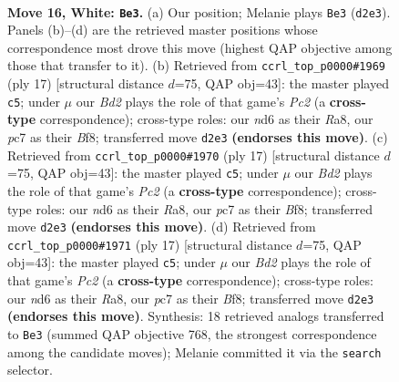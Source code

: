 \documentclass[11pt]{article}
\begin{document}
\clearpage

\begin{figure}[p]\centering
\begin{subfigure}{0.46\textwidth}\centering
\resizebox{\linewidth}{!}{%
\newchessgame
\chessboard[
  setfen={r1bq2k1/pppp1ppp/3n4/2bP4/8/2N4P/PPPB1PP1/R3QBK1 w - - 3 16},
  showmover=false,
  pgfstyle=straightmove, color=movearrow, markmove={d2-e3}
]}
\caption{}
\end{subfigure}\hfill
\begin{subfigure}{0.46\textwidth}\centering
\resizebox{\linewidth}{!}{%
\newchessgame
\chessboard[
  setfen={r2qkb1r/pbpn1ppp/1p2p3/8/3PP3/P1P2N2/2Q2PPP/R1B1KB1R b KQkq - 0 9},
  showmover=false,
  pgfstyle=straightmove, color=movearrow, markmove={c7-c5}
]}
\caption{}
\end{subfigure}
\\[4pt]
\begin{subfigure}{0.46\textwidth}\centering
\resizebox{\linewidth}{!}{%
\newchessgame
\chessboard[
  setfen={r2qkb1r/pbpn1ppp/1p2p3/8/3PP3/P1P2N2/2Q2PPP/R1B1KB1R b KQkq - 0 9},
  showmover=false,
  pgfstyle=straightmove, color=movearrow, markmove={c7-c5}
]}
\caption{}
\end{subfigure}\hfill
\begin{subfigure}{0.46\textwidth}\centering
\resizebox{\linewidth}{!}{%
\newchessgame
\chessboard[
  setfen={r2qkb1r/pbpn1ppp/1p2p3/8/3PP3/P1P2N2/2Q2PPP/R1B1KB1R b KQkq - 0 9},
  showmover=false,
  pgfstyle=straightmove, color=movearrow, markmove={c7-c5}
]}
\caption{}
\end{subfigure}
\caption{\textbf{Move 16, White: \texttt{Be3}.} (a) Our position; Melanie plays \texttt{Be3} (\texttt{d2e3}). Panels (b)--(d) are the retrieved master positions whose correspondence most drove this move (highest QAP objective among those that transfer to it). (b) Retrieved from \texttt{ccrl\_top\_p0000\#1969} (ply 17) [structural distance $d$=75, QAP obj=43]: the master played \texttt{c5}; under $\mu$ our \emph{Bd2} plays the role of that game's \emph{Pc2} (a \textbf{cross-type} correspondence); cross-type roles: our \emph{n}d6 as their \emph{R}a8, our \emph{p}c7 as their \emph{B}f8; transferred move \texttt{d2e3} \textbf{(endorses this move)}. (c) Retrieved from \texttt{ccrl\_top\_p0000\#1970} (ply 17) [structural distance $d$=75, QAP obj=43]: the master played \texttt{c5}; under $\mu$ our \emph{Bd2} plays the role of that game's \emph{Pc2} (a \textbf{cross-type} correspondence); cross-type roles: our \emph{n}d6 as their \emph{R}a8, our \emph{p}c7 as their \emph{B}f8; transferred move \texttt{d2e3} \textbf{(endorses this move)}. (d) Retrieved from \texttt{ccrl\_top\_p0000\#1971} (ply 17) [structural distance $d$=75, QAP obj=43]: the master played \texttt{c5}; under $\mu$ our \emph{Bd2} plays the role of that game's \emph{Pc2} (a \textbf{cross-type} correspondence); cross-type roles: our \emph{n}d6 as their \emph{R}a8, our \emph{p}c7 as their \emph{B}f8; transferred move \texttt{d2e3} \textbf{(endorses this move)}. Synthesis: 18 retrieved analogs transferred to \texttt{Be3} (summed QAP objective 768, the strongest correspondence among the candidate moves); Melanie committed it via the \texttt{search} selector.}
\label{fig:thought-m30}
\end{figure}
\end{document}
